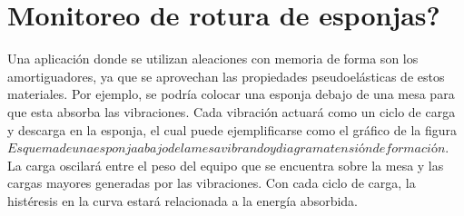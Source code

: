 \documentclass[a4paper,12pt,fleqn,twoside,openany]{book}
\begin{document}
% 




% 
% 
% 
% 
% 


\section{Monitoreo de rotura de esponjas?}



Una aplicación donde se utilizan aleaciones con memoria de forma son los amortiguadores, ya que se aprovechan las propiedades pseudoelásticas de estos materiales. Por ejemplo, se podría colocar una esponja debajo de una mesa para que esta absorba las vibraciones. Cada vibración actuará como un ciclo de carga y descarga en la esponja, el cual puede ejemplificarse como el gráfico de la figura $Esquema de una esponja abajo de la mesa vibrando y diagrama tensión deformación$. 
La carga oscilará entre el peso del equipo que se encuentra sobre la mesa y las cargas mayores generadas por las vibraciones.
Con cada ciclo de carga, la histéresis en la curva estará relacionada a la energía absorbida.  
\end{document}
